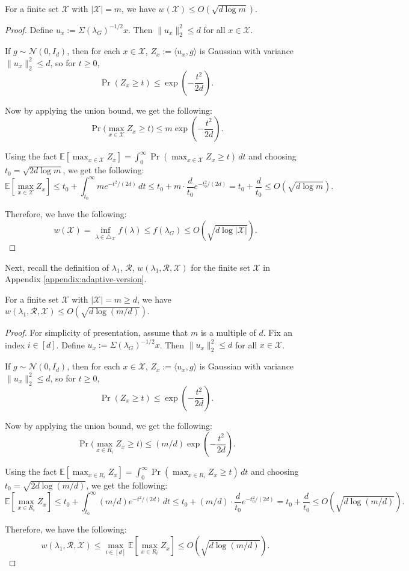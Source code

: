 \begin{proposition}
    For a finite set $\mathcal{X}$ with $|\mathcal X|=m$, we have $w(\mathcal{X})\leq O(\sqrt{d\log m})$.
\end{proposition}
\begin{proof}
Define $u_x:=\Sigma(\lambda_G)^{-1/2}x$. Then $\|u_x\|_2^2\le d$ for all $x\in\mathcal{X}$.

If $g\sim \mathcal{N}(0,I_d)$, then for each $x\in\mathcal{X}$, $Z_x:=\langle u_x,g\rangle$ is Gaussian with variance $\|u_x\|_2^2\le d$, so for $t\ge 0$,
\[
\Pr(Z_x\ge t)\le \exp\!\left(-\frac{t^2}{2d}\right).
\]

Now by applying the union bound, we get the following:
\[
\Pr\Big(\max_{x\in\mathcal X} Z_x \ge t\Big)\le m\exp\!\left(-\frac{t^2}{2d}\right).
\]

Using the fact $\mathbb E[\max_{x\in\mathcal{X}} Z_x]=\int_0^\infty \Pr(\max_{x\in\mathcal{X}} Z_x\ge t)\,dt$ and choosing $t_0=\sqrt{2d\log m}$, we get the following:
\[
\mathbb E[\max_{x\in\mathcal{X}} Z_x]\le t_0+\int_{t_0}^\infty m e^{-t^2/(2d)}\,dt\leq t_0+m\cdot \frac{d}{t_0} e^{-t_0^2/(2d)}
= t_0+ \frac{d}{t_0}\leq O(\sqrt{d\log m}).
\]

Therefore, we have the following:
\[
 w(\mathcal{X})=\inf_{\lambda\in\triangle_{\mathcal{X}}} f(\lambda) \le f(\lambda_G) \le O(\sqrt{d\log |\mathcal{X}|}).\
\]
\end{proof}

Next, recall the definition of $\lambda_1$, $\mathcal{R}$, $w(\lambda_1,\mathcal{R},\mathcal{X})$ for the finite set $\mathcal{X}$ in Appendix \ref{appendix:adaptive-version}.
\begin{proposition}\label{prop:partition-gaussian-width}
    For a finite set $\mathcal{X}$ with $|\mathcal X|=m\geq d$, we have $w(\lambda_1,\mathcal{R},\mathcal{X})\leq O(\sqrt{d\log(m/d)})$.
\end{proposition}
\begin{proof}
For simplicity of presentation, assume that $m$ is a multiple of $d$. Fix an index $i\in [d]$. Define $u_x:=\Sigma(\lambda_G)^{-1/2}x$. Then $\|u_x\|_2^2\le d$ for all $x\in\mathcal{X}$.

If $g\sim \mathcal{N}(0,I_d)$, then for each $x\in\mathcal{X}$, $Z_x:=\langle u_x,g\rangle$ is Gaussian with variance $\|u_x\|_2^2\le d$, so for $t\ge 0$,
\[
\Pr(Z_x\ge t)\le \exp\!\left(-\frac{t^2}{2d}\right).
\]

Now by applying the union bound, we get the following:
\[
\Pr\Big(\max_{x\in R_i} Z_x \ge t\Big)\le (m/d)\exp\!\left(-\frac{t^2}{2d}\right).
\]

Using the fact $\mathbb E[\max_{x\in R_i} Z_x]=\int_0^\infty \Pr(\max_{x\in R_i} Z_x\ge t)\,dt$ and choosing $t_0=\sqrt{2d\log (m/d)}$, we get the following:
\[
\mathbb E[\max_{x\in R_i} Z_x]\le t_0+\int_{t_0}^\infty (m/d) e^{-t^2/(2d)}\,dt\leq t_0+(m/d)\cdot \frac{d}{t_0} e^{-t_0^2/(2d)}
= t_0+ \frac{d}{t_0}\leq O(\sqrt{d\log (m/d)}).
\]

Therefore, we have the following:
\[
w(\lambda_1,\mathcal{R},\mathcal{X}) \le \max_{i\in[d]}\mathbb E[\max_{x\in R_i} Z_x] \le O(\sqrt{d\log(m/d)}).\
\]
\end{proof}





